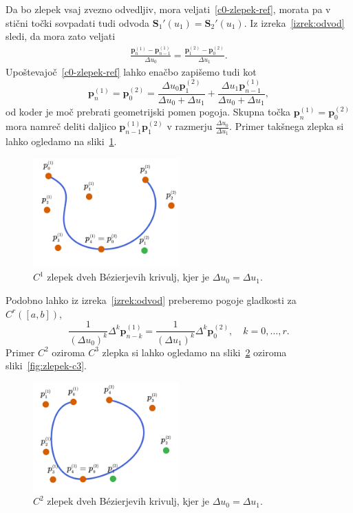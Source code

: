 \documentclass[isrm2, tisk]{fmfdelo}
\newcommand{\p}{\mathbf{p}}
\begin{document}
    \noindent Da bo zlepek vsaj zvezno odvedljiv, mora veljati~\eqref{c0-zlepek-ref}, morata pa v stični točki sovpadati tudi odvoda $\mathbf{S}_1'(u_1) = \mathbf{S}_2'(u_1)$.
    Iz izreka~\ref{izrek:odvod} sledi, da mora zato veljati
    \begin{align}
        \frac{\p_{n}^{(1)} - \p_{n-1}^{(1)}}{\Delta u_0} = \frac{\p_{1}^{(2)} - \p_{0}^{(2)}}{\Delta u_1}.
    \end{align}
    Upoštevajoč~\eqref{c0-zlepek-ref} lahko enačbo zapišemo tudi kot
    $$\p_{n}^{(1)} =  \p_{0}^{(2)}  = \frac{\Delta u_0\p_{1}^{(2)}}{\Delta u_0+\Delta u_1} + \frac{\Delta u_1\p_{n-1}^{(1)}}{\Delta u_0+\Delta u_1} ,$$
    od koder je moč prebrati geometrijski pomen pogoja.
    Skupna točka $\p_{n}^{(1)} =  \p_{0}^{(2)}$ mora namreč deliti daljico $\p_{n-1}^{(1)}\p_{1}^{(2)}$ v razmerju $\frac{\Delta u_0}{\Delta u_1}$.
    Primer takšnega zlepka si lahko ogledamo na sliki~\ref{fig:zlepek-c1}.
    \begin{figure}[h]
        \centering
        \includegraphics[width = 0.50\textwidth]{images/zlepek-c1}
        \caption{$C^1$ zlepek dveh Bézierjevih krivulj, kjer je $\Delta u_0=\Delta u_1$.}
        \label{fig:zlepek-c1}
    \end{figure}
    Podobno lahko iz izreka~\ref{izrek:odvod} preberemo pogoje gladkosti za $C^r([a,b])$,
    $$ \frac{1}{(\Delta u_0)^k}\Delta^k\p^{(1)}_{n-k}= \frac{1}{(\Delta u_1)^k}\Delta^k\p^{(2)}_{0}, \quad k=0,\dots,r.$$
    Primer $C^2$ oziroma $C^3$ zlepka si lahko ogledamo na sliki~\ref{fig:zlepek-c2} oziroma sliki~\ref{fig:zlepek-c3}.
    \begin{figure}[h]
        \centering
        \includegraphics[width = 0.50\textwidth]{images/zlepek-c2}
        \caption{$C^2$ zlepek dveh Bézierjevih krivulj, kjer je $\Delta u_0=\Delta u_1$.}
        \label{fig:zlepek-c2}
    \end{figure}
\end{document}
